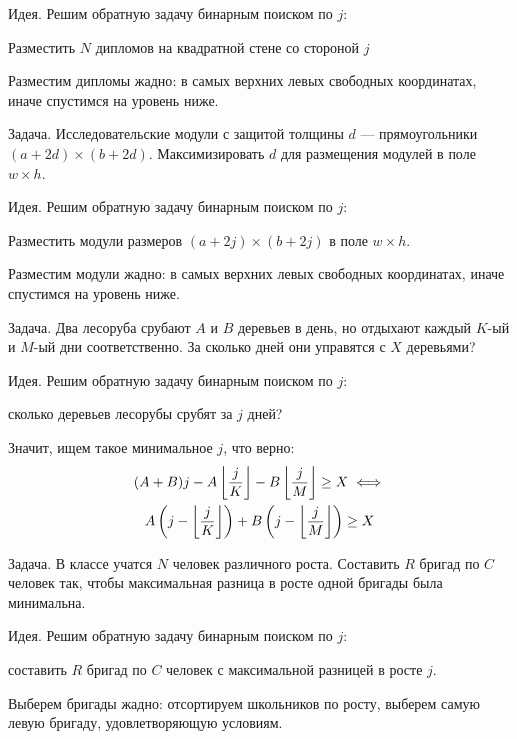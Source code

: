 {\bold Идея.} Решим обратную задачу бинарным поиском по $j$:
\begin{list*}
\item Разместить $N$ дипломов на квадратной стене со стороной $j$
\end{list*}
Разместим дипломы {\ital жадно}: в самых верхних левых свободных координатах, иначе спустимся на уровень ниже.

\begin{theorem}
{\bold Задача.} Исследовательские модули с защитой толщины $d$ --- прямоугольники $(a+2d)\times (b+2d)$. Максимизировать $d$ для размещения модулей в поле $w\times h$.
\end{theorem}

{\bold Идея.} Решим обратную задачу бинарным поиском по $j$:
\begin{list*}
\item Разместить модули размеров $(a+2j)\times (b+2j)$ в поле $w\times h$.
\end{list*}
Разместим модули {\ital жадно}: в самых верхних левых свободных координатах, иначе спустимся на уровень ниже.

\begin{theorem}
{\bold Задача.} Два лесоруба срубают $A$ и $B$ деревьев в день, но отдыхают каждый $K$-ый и $M$-ый дни соответственно. За сколько дней они управятся с $X$ деревьями?
\end{theorem}

{\bold Идея.} Решим обратную задачу бинарным поиском по $j$:
\begin{list*}
\item сколько деревьев лесорубы срубят за $j$ дней?
\end{list*}
Значит, ищем такое минимальное $j$, что верно:
$$\begin{gathered}
(A+B)j-A\left\lfloor\frac{j}{K}\right\rfloor-B\left\lfloor\frac{j}{M}\right\rfloor\geq X\iff\\
A\left(j-\left\lfloor\frac{j}{K}\right\rfloor\right)+B\left(j-\left\lfloor\frac{j}{M}\right\rfloor\right)\geq X
\end{gathered}$$
\begin{theorem}
{\bold Задача.} В классе учатся $N$ человек различного роста. Составить $R$ бригад по $C$ человек так, чтобы максимальная разница в росте одной бригады была минимальна. 
\end{theorem}

{\bold Идея.} Решим обратную задачу бинарным поиском по $j$:
\begin{list*}
\item составить $R$ бригад по $C$ человек с максимальной разницей в росте $j$. 
\end{list*}
Выберем бригады {\ital жадно}: отсортируем школьников по росту, выберем самую левую бригаду, удовлетворяющую условиям.

